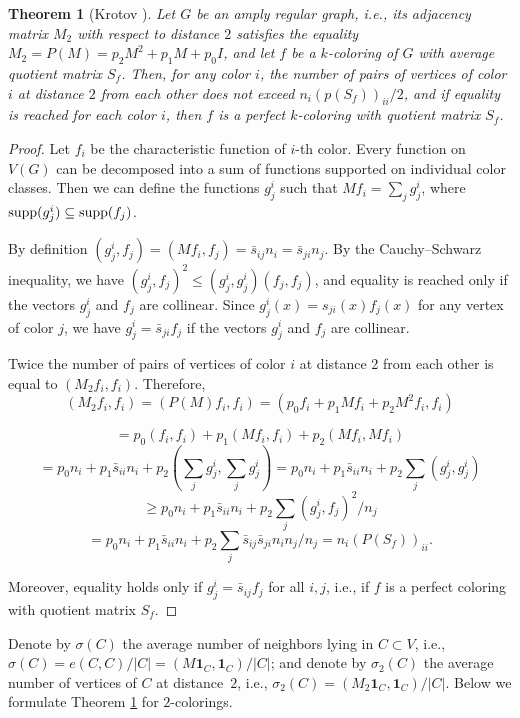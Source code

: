 \documentclass[11pt]{article}
\newtheorem{theorem}{Theorem}[section]
\theoremstyle{definition}
\newcommand{\supp}{{\rm supp}}
\begin{document}
\begin{theorem}[Krotov \cite{Krotov12}]\label{th:Krot}
Let $G$ be an amply regular graph, i.e.,
its adjacency matrix $M_2$ with respect to distance $2$ satisfies the equality
$M_2=P(M)=p_2M^2+p_1M+p_0I$, and let
$f$ be a $k$-coloring of $G$  with
average quotient matrix
$S_f$.
Then, for any color $i$, the number of pairs of vertices of color $i$ at distance
$2$ from each other does not exceed $n_i(p(S_f))_{ii}/2$, and if equality is reached for
each color $i$, then $f$ is a perfect
$k$-coloring with quotient matrix $S_f$. \end{theorem}
\begin{proof}
Let $f_i$ be the characteristic function of $i$-th
color. Every function on  $V(G)$ can be decomposed into a
sum of functions supported on individual color classes. Then we can define the functions $g^i_j$ such that
$Mf_i=\sum_jg^i_j$, where $\supp (g^i_j)\subseteq \supp (f_j)$.

By definition
$(g^i_j,f_j)= (Mf_i,f_j)=\bar s_{ij}n_i=\bar s_{ji}n_j$. By
the Cauchy--Schwarz  inequality, we have $(g^i_j,f_j)^2\leq
(g^i_j,g^i_j)(f_j,f_j)$, and equality is reached only if
the vectors $g^i_j$ and $f_j$ are collinear. Since
$g^i_j(x)=s_{ji}(x)f_j(x)$ for any vertex of color $j$, we have
 $g^i_j=\bar s_{ji}f_j$ if the vectors $g^i_j$ and $f_j$
are collinear.

Twice the number of pairs of vertices of color $i$ at distance 2 from each other
is equal to $(M_2f_i,f_i)$. Therefore,
$$(M_2f_i,f_i)= (P(M)f_i,f_i)=(p_0f_i+p_1Mf_i+p_2M^2f_i,f_i)$$ 

$$=p_0(f_i,f_i)+p_1(Mf_i,f_i)+p_2(Mf_i,Mf_i)$$
$$=p_0n_i+p_1\bar s_{ii}n_i+p_2(\sum_jg^i_j,\sum_jg^i_j)=p_0n_i+p_1\bar s_{ii}n_i+p_2\sum_j(g^i_j,g^i_j)$$
$$\geq p_0n_i+p_1\bar s_{ii}n_i+p_2\sum_j(g^i_j,f_j)^2/n_j$$
$$=p_0n_i+p_1\bar s_{ii}n_i+p_2\sum_j\bar s_{ij}\bar s_{ji}n_in_j/n_j=n_i(P(S_f))_{ii}.$$

Moreover, equality holds  only if $g^i_j=\bar
s_{ij}f_j$ for all $i,j$, i.e., if $f$ is a perfect
coloring with quotient matrix $S_f$. \end{proof}

Denote by $\sigma(C)$ the average number of  neighbors lying
in  $C\subset V$, i.e., $\sigma(C)=e(C,C)/|C|=(M{\mathbf{1}}_C,{\mathbf{1}}_C)/|C|$;
and denote by $\sigma_2(C)$ the average number of vertices of $C$ at
distance~$2$, i.e.,
$\sigma_2(C)=(M_2{\mathbf{1}}_C,{\mathbf{1}}_C)/|C|$. Below we formulate Theorem \ref{th:Krot} for $2$-colorings.
\end{document}
